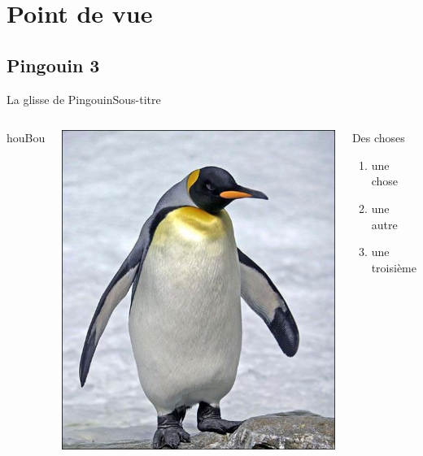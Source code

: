 \documentclass[usenames,dvipsnames, 12pt]{beamer}
\begin{document}
\section{Point de vue}
\subsection{Pingouin 3} %
 \begin{frame}{La glisse de Pingouin}{Sous-titre}
	\begin{columns}	
	\begin{center}
		houBou
	\end{center}
	\includegraphics[angle = 180, width = .8\textwidth]{Pingouin}
	
  		\begin{block}{Des choses}
  			\begin{enumerate}
  			\item	une chose
  			\item	une autre
  			\item	une troisième
  			\end{enumerate}
  		\end{block}
  		\end{columns}
 \end{frame}
\end{document}

